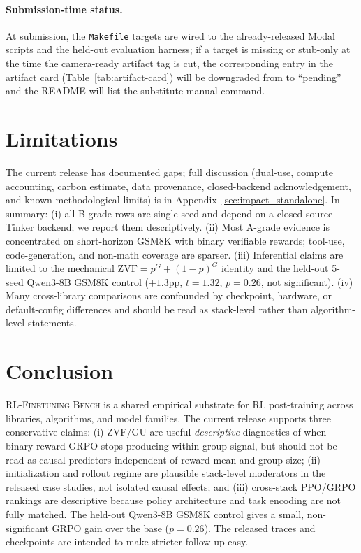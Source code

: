 \documentclass{article}
\newcommand{\ours}{\textsc{RL-Finetuning Bench}}
\begin{document}
\paragraph{Submission-time status.}
At submission, the \texttt{Makefile} targets are wired to the
already-released Modal scripts and the held-out evaluation harness; if a
target is missing or stub-only at the time the camera-ready artifact tag
is cut, the corresponding entry in the artifact card
(Table~\ref{tab:artifact-card}) will be downgraded from \checkmark{} to
``pending'' and the README will list the substitute manual command.
 
\section{Limitations}
\label{sec:limitations}


The current release has documented gaps; full discussion (dual-use,
compute accounting, carbon estimate, data provenance, closed-backend
acknowledgement, and known methodological limits) is in
Appendix~\ref{sec:impact_standalone}. In summary: (i) all B-grade rows are
single-seed and depend on a closed-source Tinker backend; we report them
descriptively. (ii) Most A-grade evidence is concentrated on
short-horizon GSM8K with binary verifiable rewards; tool-use,
code-generation, and non-math coverage are sparser. (iii) Inferential
claims are limited to the mechanical
$\mathrm{ZVF} = p^G + (1{-}p)^G$ identity and the held-out 5-seed
Qwen3-8B GSM8K control ($+1.3$pp, $t{=}1.32$, $p{=}0.26$, not
significant). (iv) Many cross-library comparisons are confounded by
checkpoint, hardware, or default-config differences and should be read
as stack-level rather than algorithm-level statements.

\section{Conclusion}
\label{sec:conclusion}

\ours{} is a shared empirical substrate for RL post-training across libraries,
algorithms, and model families. The current release supports three
conservative claims: (i) ZVF/GU are useful \emph{descriptive} diagnostics of
when binary-reward GRPO stops producing within-group signal, but should not be
read as causal predictors independent of reward mean and group size; (ii)
initialization and rollout regime are plausible stack-level moderators in the
released case studies, not isolated causal effects; and (iii) cross-stack
PPO/GRPO rankings are descriptive because policy architecture and task encoding
are not fully matched. The held-out Qwen3-8B GSM8K control gives a small,
non-significant GRPO gain over the base ($p{=}0.26$). The released traces and
checkpoints are intended to make stricter follow-up easy.
 
\end{document}
